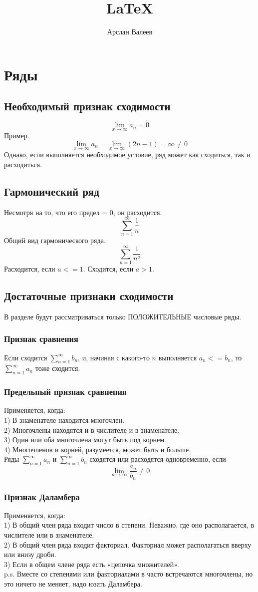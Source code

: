 \documentclass[12pt,a4paper]{article}
\title{\LaTeX}
\date{}
\author{Арслан Валеев}
\begin{document}
\section{Ряды}
\subsection{Необходимый признак сходимости}
\[ \lim_{x \to \infty}a_n=0 \]
Пример.
\[ 
\lim_{x \to \infty}a_n
=\lim_{x \to \infty}(2n-1)
=\infty \neq 0
\]
Однако, если выполняется необходимое условие, ряд может как сходиться, так и расходиться.
\subsection{Гармонический ряд}
Несмотря на то, что его предел = 0, он расходится.
\[ \sum_{n=1}^{\infty} \frac{1}{n} \]
Общий вид гармонического ряда.
\[ \sum_{n=1}^{\infty} \frac{1}{n^a} \]
Расходится, если $ a<=1 $.
Сходится, если $ a>1 $.
\subsection{Достаточные признаки сходимости}
В разделе будут рассматриваться только ПОЛОЖИТЕЛЬНЫЕ числовые ряды.
\subsubsection{Признак сравнения}
Если сходится $ \sum_{n=1}^{\infty} b_n $, и, начиная с какого-то $ n $ выполняется $ a_n <= b_n $, то $ \sum_{n=1}^{\infty} a_n $ тоже сходится.
\subsubsection{Предельный признак сравнения}
Применяется, когда: \\
1) В знаменателе находится многочлен.\\
2) Многочлены находятся и в числителе и в знаменателе.\\
3) Один или оба многочлена могут быть под корнем.\\
4) Многочленов и корней, разумеется, может быть и больше.\\

Ряды $ \sum_{n=1}^{\infty} a_n $ и $ \sum_{n=1}^{\infty} b_n $ сходятся или расходятся одновременно, если
\[ \lim_{n \to \infty} \frac{a_n}{b_n} \neq 0 \]
\subsubsection{Признак Даламбера}
Применяется, когда: \\
1) В общий член ряда входит число в степени. Неважно, где оно располагается, в числителе или в знаменателе.\\
2) В общий член ряда входит факториал. Факториал может располагаться вверху или внизу дроби.\\
3) Если в общем члене ряда есть «цепочка множителей». \\
p.s. Вместе со степенями или факториалами в часто встречаются многочлены, но это ничего не меняет, надо юзать Даламбера.
\end{document}
